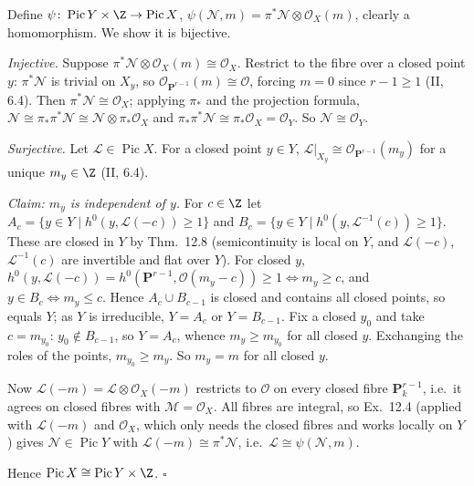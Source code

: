 \documentclass[11pt]{article}
\begin{document}
Define $\psi\colon\operatorname{Pic}Y\times\Z\to\operatorname{Pic}X$, $\psi(\mathcal N,m)=\pi^*\mathcal N\otimes\mathcal O_X(m)$, clearly a homomorphism. We show it is bijective.

\emph{Injective.} Suppose $\pi^*\mathcal N\otimes\mathcal O_X(m)\cong\mathcal O_X$. Restrict to the fibre over a closed point $y$: $\pi^*\mathcal N$ is trivial on $X_y$, so $\mathcal O_{\mathbf P^{r-1}}(m)\cong\mathcal O$, forcing $m=0$ since $r-1\ge1$ (II, 6.4). Then $\pi^*\mathcal N\cong\mathcal O_X$; applying $\pi_*$ and the projection formula, $\mathcal N\cong\pi_*\pi^*\mathcal N\cong\mathcal N\otimes\pi_*\mathcal O_X$ and $\pi_*\pi^*\mathcal N\cong\pi_*\mathcal O_X=\mathcal O_Y$. So $\mathcal N\cong\mathcal O_Y$.

\emph{Surjective.} Let $\mathcal L\in\operatorname{Pic}X$. For a closed point $y\in Y$, $\mathcal L|_{X_y}\cong\mathcal O_{\mathbf P^{r-1}}(m_y)$ for a unique $m_y\in\Z$ (II, 6.4).

\emph{Claim: $m_y$ is independent of $y$.} For $c\in\Z$ let $A_c=\{y\in Y\mid h^0(y,\mathcal L(-c))\ge1\}$ and $B_c=\{y\in Y\mid h^0(y,\mathcal L^{-1}(c))\ge1\}$. These are closed in $Y$ by Thm.~12.8 (semicontinuity is local on $Y$, and $\mathcal L(-c)$, $\mathcal L^{-1}(c)$ are invertible and flat over $Y$). For closed $y$, $h^0(y,\mathcal L(-c))=h^0(\mathbf P^{r-1},\mathcal O(m_y-c))\ge1\iff m_y\ge c$, and $y\in B_c\iff m_y\le c$. Hence $A_c\cup B_{c-1}$ is closed and contains all closed points, so equals $Y$; as $Y$ is irreducible, $Y=A_c$ or $Y=B_{c-1}$. Fix a closed $y_0$ and take $c=m_{y_0}$: $y_0\notin B_{c-1}$, so $Y=A_c$, whence $m_y\ge m_{y_0}$ for all closed $y$. Exchanging the roles of the points, $m_{y_0}\ge m_y$. So $m_y=m$ for all closed $y$.

Now $\mathcal L(-m)=\mathcal L\otimes\mathcal O_X(-m)$ restricts to $\mathcal O$ on every closed fibre $\mathbf P^{r-1}_k$, i.e.\ it agrees on closed fibres with $\mathcal M=\mathcal O_X$. All fibres are integral, so Ex.~12.4 (applied with $\mathcal L(-m)$ and $\mathcal O_X$, which only needs the closed fibres and works locally on $Y$) gives $\mathcal N\in\operatorname{Pic}Y$ with $\mathcal L(-m)\cong\pi^*\mathcal N$, i.e.\ $\mathcal L\cong\psi(\mathcal N,m)$.

Hence $\operatorname{Pic}X\cong\operatorname{Pic}Y\times\Z$. \hfill$\square$
\end{document}
